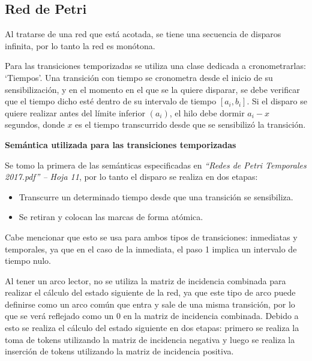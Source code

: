 \documentclass[12pt,a4paper]{article}
\begin{document}
\subsection{Red de Petri}
Al tratarse de una red que está acotada, se tiene una secuencia de disparos infinita, por lo tanto la red es monótona.

Para las transiciones temporizadas se utiliza una clase dedicada a cronometrarlas: ‘Tiempos’. Una transición con tiempo se cronometra desde el inicio de su sensibilización, y en el momento en el que se la quiere disparar, se debe verificar que el tiempo dicho esté dentro de su intervalo de tiempo $[a_i , b_i]$. Si el disparo se quiere realizar antes del límite inferior $(a_i)$, el hilo debe dormir $a_i-x$ segundos, donde $x$ es el tiempo transcurrido desde que se sensibilizó la transición.

\textbf{Semántica utilizada para las transiciones temporizadas}

Se tomo la primera de las semánticas especificadas en \textit{“Redes de Petri Temporales 2017.pdf” -- Hoja 11}, por lo tanto el disparo se realiza en dos etapas:
\begin{itemize}
    \item Transcurre un determinado tiempo desde que una transición se sensibiliza.
    \item Se retiran y colocan las marcas de forma atómica.
\end{itemize}

Cabe mencionar que esto se usa para ambos tipos de transiciones: inmediatas y temporales, ya que en el caso de la inmediata, el paso 1 implica un intervalo de tiempo nulo.

Al tener un arco lector, no se utiliza la matriz de incidencia combinada para realizar el cálculo del estado siguiente de la red, ya que este tipo de arco puede definirse como un arco común que entra y sale de una misma transición, por lo que se verá reflejado como un 0 en la matriz de incidencia combinada. Debido a esto se realiza el cálculo del estado siguiente en dos etapas: primero se realiza la toma de tokens utilizando la matriz de incidencia negativa y luego se realiza la inserción de tokens utilizando la matriz de incidencia positiva.
\end{document}
